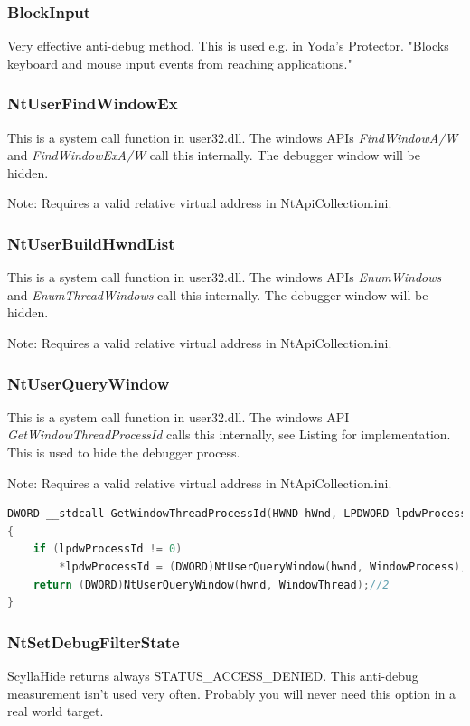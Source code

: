 \documentclass[10pt,a4paper]{article}
\begin{document}
\subsubsection{BlockInput}
Very effective anti-debug method. This is used e.g. in Yoda's Protector. "Blocks keyboard and mouse input events from reaching applications."

\subsubsection{NtUserFindWindowEx}
This is a system call function in user32.dll. The windows APIs \textit{FindWindowA/W} and \textit{FindWindowExA/W} call this internally. The debugger window will be hidden.

Note: Requires a valid relative virtual address in NtApiCollection.ini.

\subsubsection{NtUserBuildHwndList}
This is a system call function in user32.dll. The windows APIs \textit{EnumWindows} and \textit{EnumThreadWindows} call this internally. The debugger window will be hidden.

Note: Requires a valid relative virtual address in NtApiCollection.ini.

\subsubsection{NtUserQueryWindow}
This is a system call function in user32.dll. The windows API \textit{GetWindowThreadProcessId} calls this internally, see Listing for implementation. This is used to hide the debugger process.

Note: Requires a valid relative virtual address in NtApiCollection.ini.

\begin{lstlisting}[language=C, caption=GetWindowThreadProcessId Implementation]
DWORD __stdcall GetWindowThreadProcessId(HWND hWnd, LPDWORD lpdwProcessId)
{
	if (lpdwProcessId != 0)
		*lpdwProcessId = (DWORD)NtUserQueryWindow(hwnd, WindowProcess);//0
	return (DWORD)NtUserQueryWindow(hwnd, WindowThread);//2
}
\end{lstlisting}

\subsubsection{NtSetDebugFilterState}
ScyllaHide returns always STATUS\_ACCESS\_DENIED. This anti-debug measurement isn't used very often. Probably you will never need this option in a real world target.
\end{document}
